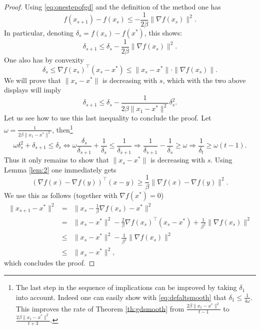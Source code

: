 \begin{proof}
Using \eqref{eq:onestepofgd} and the definition of the method one has
$$f(x_{s+1}) - f(x_s) \leq - \frac{1}{2 \beta} \|\nabla f(x_s)\|^2.$$
In particular, denoting $\delta_s = f(x_s) - f(x^*)$, this shows:
$$\delta_{s+1} \leq \delta_s  - \frac{1}{2 \beta} \|\nabla f(x_s)\|^2.$$
One also has by convexity
$$\delta_s \leq \nabla f(x_s)^{\top} (x_s - x^*) \leq \|x_s - x^*\| \cdot \|\nabla f(x_s)\| .$$
We will prove that $\|x_s - x^*\|$ is decreasing with $s$, which with the two above displays will imply
$$\delta_{s+1} \leq \delta_s  - \frac{1}{2 \beta \|x_1 - x^*\|^2} \delta_s^2.$$
Let us see how to use this last inequality to conclude the proof. Let $\omega = \frac{1}{2 \beta \|x_1 - x^*\|^2}$, then\footnote{The last step in the sequence of implications can be improved by taking $\delta_1$ into account. Indeed one can easily show with \eqref{eq:defaltsmooth} that $\delta_1 \leq \frac{1}{4 \omega}$. This improves the rate of Theorem \ref{th:gdsmooth} from $\frac{2 \beta \|x_1 - x^*\|^2}{t-1}$ to $\frac{2 \beta \|x_1 - x^*\|^2}{t+3}$.}
$$\omega \delta_s^2 + \delta_{s+1} \leq \delta_s \Leftrightarrow \omega \frac{\delta_s}{\delta_{s+1}} + \frac{1}{\delta_{s}} \leq \frac{1}{\delta_{s+1}} \Rightarrow \frac{1}{\delta_{s+1}} - \frac{1}{\delta_{s}} \geq \omega \Rightarrow \frac{1}{\delta_t} \geq \omega (t-1) .$$
Thus it only remains to show that $\|x_s - x^*\|$ is decreasing with $s$. Using Lemma \ref{lem:2} one immediately gets
\begin{equation} \label{eq:coercive1}
(\nabla f(x) - \nabla f(y))^{\top} (x - y) \geq \frac{1}{\beta} \|\nabla f(x) - \nabla f(y)\|^2 .
\end{equation}
We use this as follows (together with $\nabla f(x^*) = 0$)
\begin{eqnarray*}
\|x_{s+1} - x^*\|^2& = & \|x_{s} - \frac{1}{\beta} \nabla f(x_s) - x^*\|^2 \\
& = & \|x_{s} - x^*\|^2 - \frac{2}{\beta} \nabla f(x_s)^{\top} (x_s - x^*) + \frac{1}{\beta^2} \|\nabla f(x_s)\|^2 \\
& \leq & \|x_{s} - x^*\|^2 - \frac{1}{\beta^2} \|\nabla f(x_s)\|^2 \\
& \leq & \|x_{s} - x^*\|^2 ,
\end{eqnarray*}
which concludes the proof.
\end{proof}

